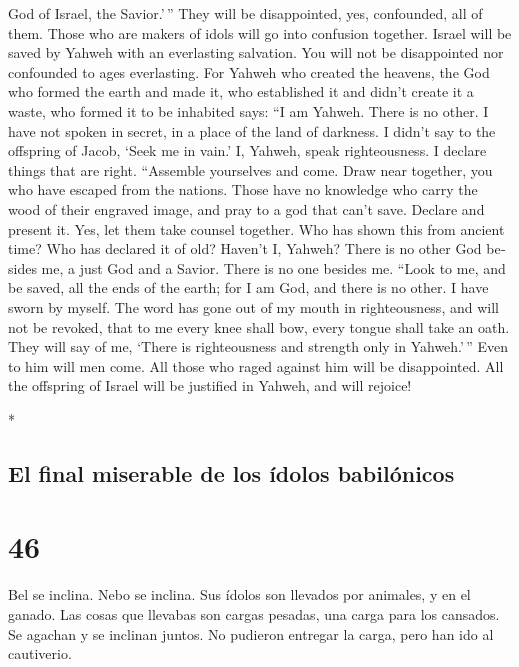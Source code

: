 \begin{paracol}{2}
\begin{otherlanguage}{english}
God of Israel, the Savior.'\,''  They will be
disappointed, yes, confounded, all of them. Those who are makers of
idols will go into confusion together.  Israel will be
saved by Yahweh with an everlasting salvation. You will not be
disappointed nor confounded to ages everlasting.  For
Yahweh who created the heavens, the God who formed the earth and made
it, who established it and didn't create it a waste, who formed it to be
inhabited says: ``I am Yahweh. There is no other.  I have
not spoken in secret, in a place of the land of darkness. I didn't say
to the offspring of Jacob, `Seek me in vain.' I, Yahweh, speak
righteousness. I declare things that are right. 
``Assemble yourselves and come. Draw near together, you who have escaped
from the nations. Those have no knowledge who carry the wood of their
engraved image, and pray to a god that can't save. 
Declare and present it. Yes, let them take counsel together. Who has
shown this from ancient time? Who has declared it of old? Haven't I,
Yahweh? There is no other God besides me, a just God and a Savior. There
is no one besides me.  ``Look to me, and be saved, all
the ends of the earth; for I am God, and there is no other.
 I have sworn by myself. The word has gone out of my
mouth in righteousness, and will not be revoked, that to me every knee
shall bow, every tongue shall take an oath.  They will
say of me, `There is righteousness and strength only in Yahweh.'\,''
Even to him will men come. All those who raged against him will be
disappointed.  All the offspring of Israel will be
justified in Yahweh, and will rejoice!

\end{otherlanguage}

\switchcolumn[0]*

\hypertarget{el-final-miserable-de-los-uxeddolos-babiluxf3nicos}{%
\subsection{El final miserable de los ídolos
babilónicos}\label{el-final-miserable-de-los-uxeddolos-babiluxf3nicos}}

\hypertarget{section-90}{%
\section{46}\label{section-90}}

 Bel se inclina. Nebo se inclina. Sus ídolos son llevados
por animales, y en el ganado. Las cosas que llevabas son cargas pesadas,
una carga para los cansados.  Se agachan y se inclinan
juntos. No pudieron entregar la carga, pero han ido al cautiverio.


\end{paracol}
